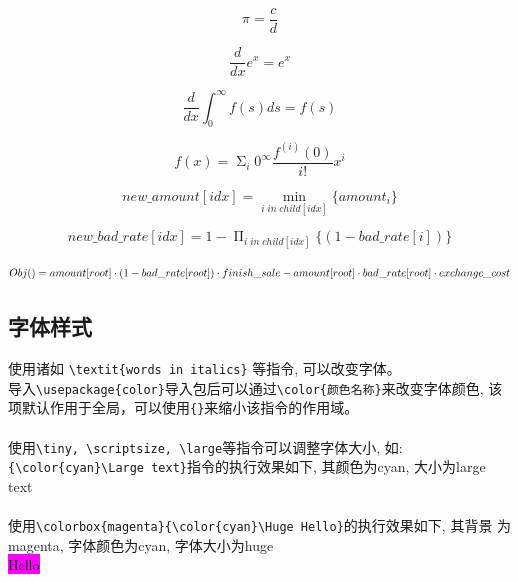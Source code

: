 \documentclass{article}
\begin{document}
            \begin{equation}
            \pi = \frac c d
            \end{equation}

            \begin{equation}
            \frac{d}{dx}e^x=e^x
            \end{equation}

            \begin{equation}
            \frac{d}{dx} \int _0 ^\infty {f(s)ds} = f(s)
            \end{equation}

            \begin{equation}
            f(x) = \mathop{\Sigma} _i 0^{\infty} \frac{f^{(i)}(0)}{i!}x^i
            \end{equation}

            \begin{equation}
                new\_amount[idx] = \mathop{\min}_{i \; in \; child[idx]} \{amount_{i}\}           
            \end{equation}

            \begin{equation}
                new\_bad\_rate[idx] = 1 - \mathop{\Pi}_{i \; in \; child[idx]} \{(1-bad\_rate[i])\}     
            \end{equation}

            \begin{equation}
                Obj() = amount[root] \cdot (1 - bad\_rate[root]) \cdot finish\_sale -  
                amount[root] \cdot \\
                bad\_rate[root] \cdot exchange\_cost
            \end{equation}

        \subsection {字体样式}
            使用诸如 \verb|\textit{words in italics}| 等指令, 可以改变字体。
            \hspace*{\fill} \\
            导入\verb|\usepackage{color}|导入包后可以通过\verb|\color{颜色名称}|来改变字体颜色, 
            该项默认作用于全局，可以使用\verb|{}|来缩小该指令的作用域。\\
            \hspace*{\fill} \\
            使用\verb|\tiny, \scriptsize, \large|等指令可以调整字体大小, 如: \\
            \verb|{\color{cyan}\Large text}|指令的执行效果如下, 其颜色为cyan, 大小为large\\
            {\color{cyan}\Large text}\\
            \hspace*{\fill} \\
            使用\verb|\colorbox{magenta}{\color{cyan}\Huge Hello}|的执行效果如下, 其背景
            为magenta, 字体颜色为cyan, 字体大小为huge\\
            \colorbox{magenta}{\color{cyan}\Huge Hello}
\end{document}
